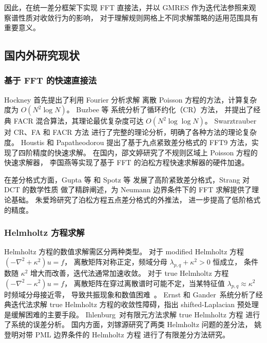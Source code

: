 因此，在统一差分框架下实现 FFT 直接法，并以 GMRES 作为迭代法参照来观察谱性质对收敛行为的影响，
对于理解规则网格上不同求解策略的适用范围具有重要意义。

\subsection{国内外研究现状}

\subsubsection{基于 FFT 的快速直接法}

Hockney \cite{Hockney1965} 首先提出了利用 Fourier 分析求解
离散 Poisson 方程的方法，计算复杂度为 $O(N^2 \log N)$。
Buzbee 等 \cite{Buzbee1970} 系统分析了循环约化（CR）方法，
并提出了经典 FACR 混合算法，其理论最优复杂度可达 $O(N^2 \log\log N)$。
Swarztrauber \cite{Swarztrauber1977} 对 CR、FA 和 FACR 方法
进行了完整的理论分析，明确了各种方法的理论复杂度。
Houstis 和 Papatheodorou \cite{HoustisPapatheodorou1979a, HoustisPapatheodorou1979b}
提出了基于九点紧致差分格式的 FFT9 方法，实现了四阶精度的快速求解。
在国内，邵文婷\cite{ShaoWenting2017}研究了不规则区域上 Poisson 方程的快速求解器，
李国燕等\cite{LiGuoyan2019}实现了基于 FFT 的泊松方程快速求解器的硬件加速。

在差分格式方面，Gupta 等 \cite{Gupta1984} 和 Spotz 等 \cite{Spotz1998}
发展了高阶紧致差分格式，Strang \cite{Strang1999} 对 DCT 的数学性质
做了精辟阐述，为 Neumann 边界条件下的 FFT 求解提供了理论基础。
朱爱玲\cite{ZhuAiling2015}研究了泊松方程五点差分格式的外推法，
进一步提高了低阶格式的精度。

\subsubsection{Helmholtz 方程求解}

Helmholtz 方程的数值求解需区分两种类型。
对于 modified Helmholtz 方程 $(-\nabla^2+\kappa^2)u=f$，
离散矩阵对称正定，频域分母 $\lambda_{p,q}+\kappa^2 > 0$ 恒成立，
条件数随 $\kappa^2$ 增大而改善，迭代法通常加速收敛。
对于 true Helmholtz 方程 $(-\nabla^2-\kappa^2)u=f$，
离散矩阵在穿过离散谱时可能不定，当某特征值 $\lambda_{p,q}\approx\kappa^2$ 时频域分母接近零，
导致共振现象和数值困难~\cite{Bayliss1983, Ernst2011}。
Ernst 和 Gander~\cite{Ernst2011}系统分析了经典迭代法求解 true Helmholtz
方程的收敛性障碍，指出 shifted-Laplacian 预处理是缓解困难的主要手段。
Ihlenburg~\cite{Ihlenburg1998}对有限元方法求解 true Helmholtz 方程
进行了系统的误差分析。
国内方面，刘镓源\cite{LiuJiayuan2019}研究了两类 Helmholtz 问题的差分法，
姚登明\cite{YaoDengming2018}对带 PML 边界条件的 Helmholtz 方程
进行了有限差分方法研究。

